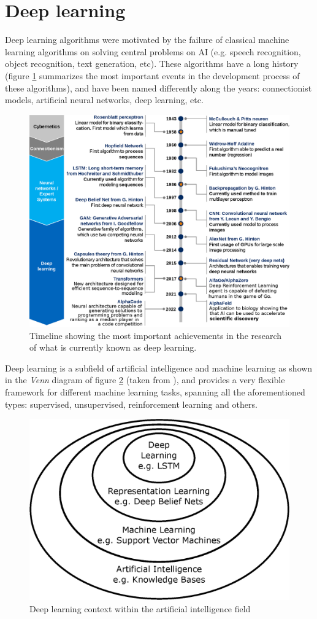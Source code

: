\section{Deep learning}

Deep learning algorithms were motivated by the failure of classical machine learning algorithms on solving central problems on AI (e.g. speech recognition, object recognition, text generation, etc). These algorithms have a long history (figure \ref{fig:dl-timeline} summarizes the most important events in the development process of these algorithms), and have been named differently along the years: connectionist models, artificial neural networks, deep learning, etc.

\begin{figure}
	\centering
	\includegraphics[width=1.0\linewidth]{chapter2/images/DL-timeline}
	\caption{Timeline showing the most important achievements in the research of what is currently known as deep learning.}
	\label{fig:dl-timeline}
\end{figure}


Deep learning is a subfield of artificial intelligence and machine learning as shown in the \textit{Venn} diagram of figure \ref{fig:venndl} (taken from \autocite{Goodfellow2016}), and provides a very flexible framework for different machine learning tasks, spanning all the aforementioned types: supervised, unsupervised, reinforcement learning and others.

\begin{figure}
	\centering
	\includegraphics[width=0.5\linewidth]{chapter2/images/venn_DL}
	\caption{Deep learning context within the artificial intelligence field \autocite{Goodfellow2016}}
	\label{fig:venndl}
\end{figure}



